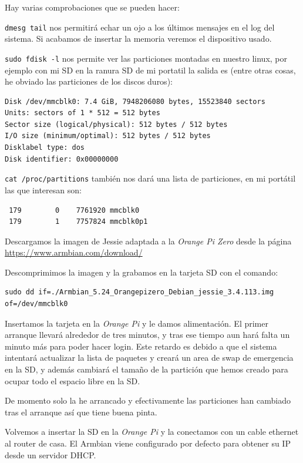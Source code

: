 \documentclass[12pt,spanish,]{scrartcl}
\begin{document}
Hay varias comprobaciones que se pueden hacer:

\texttt{dmesg\ \textbar{}tail} nos permitirá echar un ojo a los últimos
mensajes en el log del sistema. Si acabamos de insertar la memoria
veremos el dispositivo usado.

\texttt{sudo\ fdisk\ -l} nos permite ver las particiones montadas en
nuestro linux, por ejemplo con mi SD en la ranura SD de mi portatil la
salida es (entre otras cosas, he obviado las particiones de los discos
duros):

\begin{verbatim}
Disk /dev/mmcblk0: 7.4 GiB, 7948206080 bytes, 15523840 sectors
Units: sectors of 1 * 512 = 512 bytes
Sector size (logical/physical): 512 bytes / 512 bytes
I/O size (minimum/optimal): 512 bytes / 512 bytes
Disklabel type: dos
Disk identifier: 0x00000000
\end{verbatim}

\texttt{cat\ /proc/partitions} también nos dará una lista de
particiones, en mi portátil las que interesan son:

\begin{verbatim}
 179        0    7761920 mmcblk0
 179        1    7757824 mmcblk0p1
\end{verbatim}

Descargamos la imagen de Jessie adaptada a la \emph{Orange Pi Zero}
desde la página \url{https://www.armbian.com/download/}

Descomprimimos la imagen y la grabamos en la tarjeta SD con el comando:

\begin{verbatim}
sudo dd if=./Armbian_5.24_Orangepizero_Debian_jessie_3.4.113.img of=/dev/mmcblk0
\end{verbatim}

Insertamos la tarjeta en la \emph{Orange Pi} y le damos alimentación. El
primer arranque llevará alrededor de tres minutos, y tras ese tiempo aun
hará falta un minuto más para poder hacer login. Este retardo es debido
a que el sistema intentará actualizar la lista de paquetes y creará un
area de swap de emergencia en la SD, y además cambiará el tamaño de la
partición que hemos creado para ocupar todo el espacio libre en la SD.

De momento solo la he arrancado y efectivamente las particiones han
cambiado tras el arranque así que tiene buena pinta.

Volvemos a insertar la SD en la \emph{Orange Pi} y la conectamos con un
cable ethernet al router de casa. El Armbian viene configurado por
defecto para obtener su IP desde un servidor DHCP.
\end{document}
